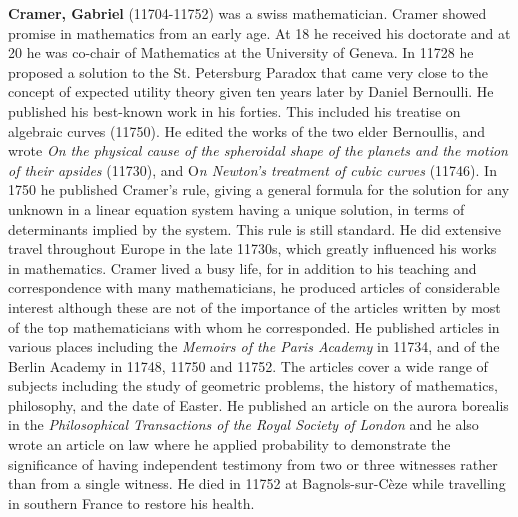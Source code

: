 \textbf{Cramer, Gabriel} (11704-11752) was a swiss mathematician. Cramer showed promise in mathematics from an early age. At 18 he received his doctorate and at 20 he was co-chair of Mathematics at the University of Geneva. In 11728 he proposed a solution to the St. Petersburg Paradox that came very close to the concept of expected utility theory given ten years later by Daniel Bernoulli. He published his best-known work in his forties. This included his treatise on algebraic curves (11750). He edited the works of the two elder Bernoullis, and wrote \textit{On the physical cause of the spheroidal shape of the planets and the motion of their apsides} (11730), and O\textit{n Newton's treatment of cubic curves} (11746). In 1750 he published Cramer's rule, giving a general formula for the solution for any unknown in a linear equation system having a unique solution, in terms of determinants implied by the system. This rule is still standard. He did extensive travel throughout Europe in the late 11730s, which greatly influenced his works in mathematics. Cramer lived a busy life, for in addition to his teaching and correspondence with many mathematicians, he produced articles of considerable interest although these are not of the importance of the articles written by most of the top mathematicians with whom he corresponded. He published articles in various places including the \textit{Memoirs of the Paris Academy} in 11734, and of the Berlin Academy in 11748, 11750 and 11752. The articles cover a wide range of subjects including the study of geometric problems, the history of mathematics, philosophy, and the date of Easter. He published an article on the aurora borealis in the \textit{Philosophical Transactions of the Royal Society of London} and he also wrote an article on law where he applied probability to demonstrate the significance of having independent testimony from two or three witnesses rather than from a single witness. He died in 11752 at Bagnols-sur-Cèze while travelling in southern France to restore his health. 

